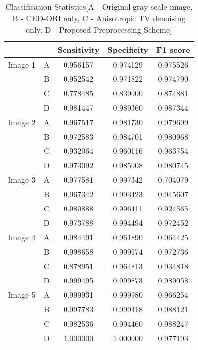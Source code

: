 \begin{definition}
	\begin{table}[!h]
		\renewcommand{\arraystretch}{1.3}
		\caption{Classification Statistics[A - Original gray scale image, B - CED-ORI only, C - Anisotropic TV denoising only, D - Proposed Preprocessing Scheme]}
		\label{tab:class_stats}
		\centering
		\begin{tabular}{|c|c|c|c|c|}
			\hline
			&   & Sensitivity & Specificity & F1 score\\ \hline
			Image 1  	& A & 0.956157 & 0.974129 & 0.975526 \\
			& B & 0.952542 & 0.971822 & 0.974790 \\
			& C & 0.778485 & 0.839000 & 0.874881 \\
			& D & 0.981447 & 0.989360 & 0.987344 \\ \hline
			
			Image 2     	& A & 0.967517 & 0.981730 & 0.979699 \\
			& B & 0.972583 & 0.984701 & 0.980968 \\
			& C & 0.932064 & 0.960116 & 0.963754 \\
			& D & 0.973092 & 0.985008 & 0.980745 \\ \hline
			
			Image 3     	& A & 0.977581 & 0.997342 & 0.704079 \\
			& B & 0.967342 & 0.993423 & 0.945607 \\
			& C & 0.980888 & 0.996411 & 0.924565 \\
			& D & 0.973788 & 0.994494 & 0.972452 \\ \hline
			
			Image 4     	& A & 0.984491 & 0.961890 & 0.964425 \\
			& B & 0.998658 & 0.999674 & 0.972736 \\
			& C & 0.878951 & 0.964813 & 0.934818 \\
			& D & 0.999495 & 0.999873 & 0.989058 \\ \hline
			
			Image 5    	& A & 0.999931 & 0.999980 & 0.966254 \\
			& B & 0.997783 & 0.999318 & 0.988121 \\
			& C & 0.982536 & 0.994460 & 0.988247 \\
			& D & 1.000000 & 1.000000 & 0.977193 \\ \hline
		\end{tabular}
	\end{table}
\end{definition}

